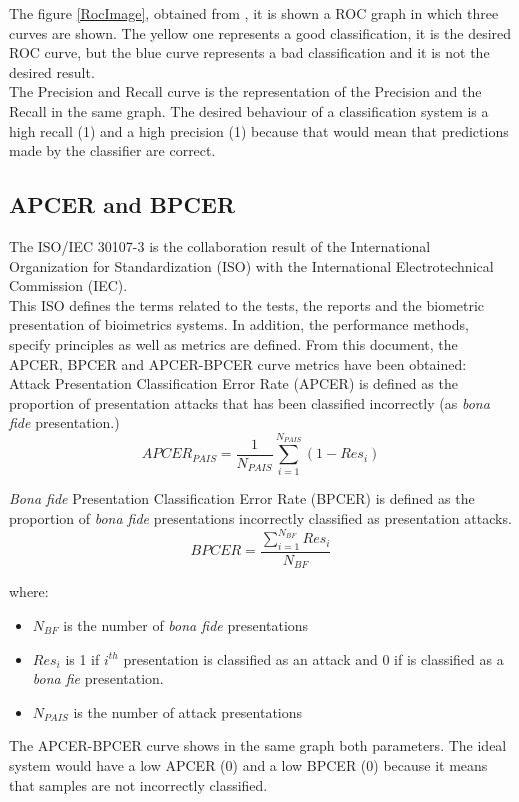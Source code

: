 The figure \ref{RocImage}, obtained from \cite{RocImage}, it is shown a ROC graph in which three curves are shown.  The yellow one represents a good classification, it is the desired ROC curve, but the blue curve represents a bad classification and it is not the desired result.\\

The Precision and Recall curve is the representation of the Precision and the Recall in the same graph. The desired behaviour of a classification system is a high recall (1) and a high precision (1) because that would mean that predictions made by the classifier are correct.\\

\subsection{APCER and BPCER}
The ISO/IEC 30107-3 \cite{ISO} is the collaboration result of  the International Organization for Standardization (ISO) with the International Electrotechnical Commission (IEC).\\

This ISO defines the terms related to the tests, the reports and the biometric presentation of bioimetrics systems. In addition, the performance methods, specify principles as well as metrics are defined. From this document, the APCER, BPCER and APCER-BPCER curve metrics have been obtained:\\

Attack Presentation Classification Error Rate (APCER) is defined as the proportion of presentation attacks that has been classified incorrectly (as \textit{bona fide} presentation.)\\

\begin{equation}
  APCER_{PAIS} = \frac{1}{N_{PAIS}}\sum_{i=1}^{N_{PAIS}}(1 - Res_{i})
\end{equation}

\textit{Bona fide} Presentation Classification Error Rate (BPCER) is defined as the proportion of \textit{bona fide} presentations  incorrectly classified as presentation attacks.\\

\begin{equation}
  BPCER = \frac{\sum_{i=1}^{N_{BF}}Res_{i}}{N_{BF}}
\end{equation}

where: \begin{itemize}
\item $N_{BF}$ is the number of \textit{bona fide} presentations
\item $Res_{i}$ is 1 if $i^{th}$ presentation is classified as an attack and 0 if is classified as a \textit{bona fie} presentation.
\item $N_{PAIS}$ is the number of attack presentations
\end{itemize}

The APCER-BPCER curve shows in the same graph both parameters. The ideal system would have a low APCER (0) and a low BPCER (0) because it means that samples are not incorrectly classified.\\ 
